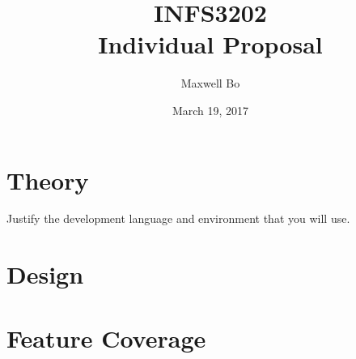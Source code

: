 \documentclass[11pt,a4paper]{report}
\begin{document}
\title{INFS3202 \\ Individual Proposal}
\author{Maxwell Bo}
\date{March 19, 2017}
\maketitle

\chapter{Theory}

Justify the development language and environment that you will use.

\chapter{Design}

\chapter{Feature Coverage}



\end{document}
